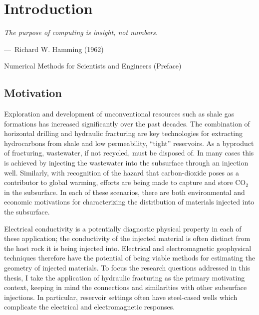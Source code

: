 

\chapter{Introduction}
\label{ch:introduction}


\hspace{0pt}
\begin{epigraph}
    \emph{
        The purpose of computing is insight, not numbers.
    }
    \vspace{1em}

    ---~Richard W. Hamming (1962)

    Numerical Methods for Scientists and Engineers (Preface)
\end{epigraph}
\bigskip
\bigskip

\section{Motivation}

Exploration and development of unconventional resources such as shale gas formations has increased significantly over the past decades. The combination of horizontal drilling and hydraulic fracturing are key technologies for extracting hydrocarbons from shale and low permeability, ``tight'' reservoirs. As a byproduct of fracturing, wastewater, if not recycled, must be disposed of. In many cases this is achieved by injecting the wastewater into the subsurface through an injection well. Similarly, with recognition of the hazard that carbon-dioxide poses as a contributor to global warming, efforts are being made to capture and store CO$_2$ in the subsurface. In each of these scenarios, there are both environmental and economic motivations for characterizing the distribution of materials injected into the subsurface.

Electrical conductivity is a potentially diagnostic physical property in each of these application; the conductivity of the injected material is often distinct from the host rock it is being injected into. Electrical and electromagnetic geophysical techniques therefore have the potential of being viable methods for estimating the geometry of injected materials. To focus the research questions addressed in this thesis, I take the application of hydraulic fracturing as the primary motivating context, keeping in mind the connections and similarities with other subsurface injections. In particular, reservoir settings often have steel-cased wells which complicate the electrical and electromagnetic responses.


